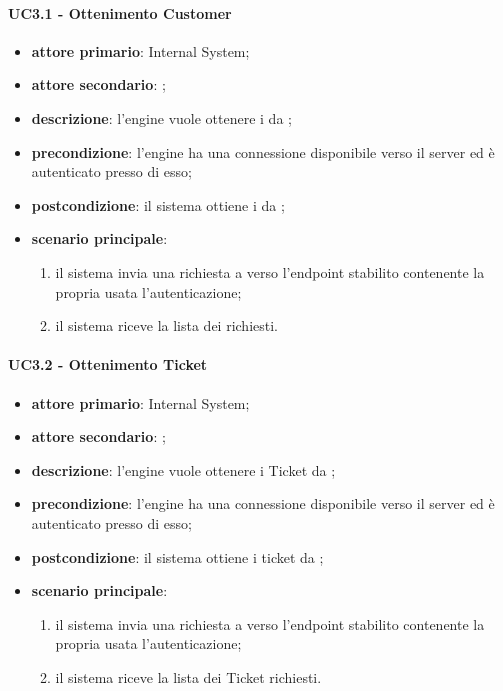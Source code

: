 \paragraph{UC3.1 - Ottenimento Customer}
\begin{itemize}
	\item \textbf{attore primario}: Internal System;
	\item \textbf{attore secondario}: ;
	\item \textbf{descrizione}: l'engine vuole ottenere i   da ;
	\item \textbf{precondizione}: l'engine ha una connessione disponibile verso il server  ed è autenticato presso di esso;
	\item \textbf{postcondizione}: il sistema ottiene i   da ;
	\item \textbf{scenario principale}: 
	\begin{enumerate}
		\item il sistema invia una richiesta a  verso l'endpoint stabilito contenente la propria  usata l'autenticazione;
		\item il sistema riceve la lista dei   richiesti.
	\end{enumerate}
\end{itemize}
\paragraph{UC3.2 - Ottenimento Ticket}
\begin{itemize}
	\item \textbf{attore primario}: Internal System;
	\item \textbf{attore secondario}: ;
	\item \textbf{descrizione}: l'engine vuole ottenere i Ticket da ;
	\item \textbf{precondizione}: l'engine ha una connessione disponibile verso il server  ed è autenticato presso di esso;
	\item \textbf{postcondizione}: il sistema ottiene i ticket da ;
	\item \textbf{scenario principale}: 
	\begin{enumerate}
		\item il sistema invia una richiesta a  verso l'endpoint stabilito contenente la propria  usata l'autenticazione;
		\item il sistema riceve la lista dei Ticket richiesti.
	\end{enumerate}
\end{itemize}
